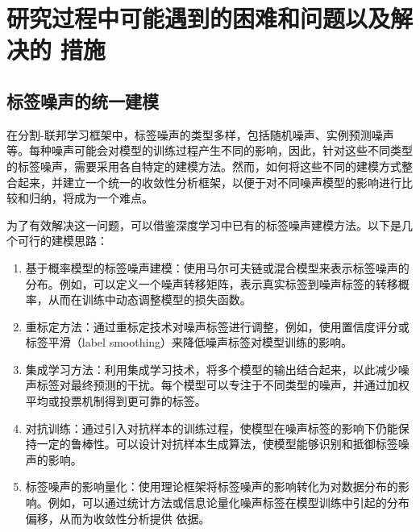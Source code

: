 \chapter{研究过程中可能遇到的困难和问题以及解决的
措施}


\section{标签噪声的统一建模}
在分割-联邦学习框架中，标签噪声的类型多样，包括随机噪声、实例预测噪声等。每种噪声可能会对模型的训练过程产生不同的影响，因此，针对这些不同类型的标签噪声，需要采用各自特定的建模方法。然而，如何将这些不同的建模方式整合起来，并建立一个统一的收敛性分析框架，以便于对不同噪声模型的影响进行比较和归纳，将成为一个难点。

为了有效解决这一问题，可以借鉴深度学习中已有的标签噪声建模方法。以下是几个可行的建模思路：
\begin{enumerate}

    \item 基于概率模型的标签噪声建模：使用马尔可夫链或混合模型来表示标签噪声的分布。例如，可以定义一个噪声转移矩阵，表示真实标签到噪声标签的转移概率，从而在训练中动态调整模型的损失函数。

    \item 重标定方法：通过重标定技术对噪声标签进行调整，例如，使用置信度评分或标签平滑（label smoothing）来降低噪声标签对模型训练的影响。

    \item 集成学习方法：利用集成学习技术，将多个模型的输出结合起来，以此减少噪声标签对最终预测的干扰。每个模型可以专注于不同类型的噪声，并通过加权平均或投票机制得到更可靠的标签。

    \item 对抗训练：通过引入对抗样本的训练过程，使模型在噪声标签的影响下仍能保持一定的鲁棒性。可以设计对抗样本生成算法，使模型能够识别和抵御标签噪声的影响。

    \item 标签噪声的影响量化：使用理论框架将标签噪声的影响转化为对数据分布的影响。例如，可以通过统计方法或信息论量化噪声标签在模型训练中引起的分布偏移，从而为收敛性分析提供
    依据。
\end{enumerate}



